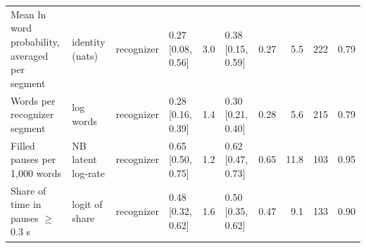 {\begin{tabular}{@{}p{}p{}llrlrrrr@{}}
Mean ln word probability, averaged per segment & identity (nats) & recognizer & 0.27 [0.08, 0.56] & 3.0 & 0.38 [0.15, 0.59] & 0.27 & 5.5 & 222 & 0.79 \\
Words per recognizer segment & log words & recognizer & 0.28 [0.16, 0.39] & 1.4 & 0.30 [0.21, 0.40] & 0.28 & 5.6 & 215 & 0.79 \\
Filled pauses per 1,000 words & NB latent log-rate & recognizer & 0.65 [0.50, 0.75] & 1.2 & 0.62 [0.47, 0.73] & 0.65 & 11.8 & 103 & 0.95 \\
Share of time in pauses $\geq$ 0.3 s & logit of share & recognizer & 0.48 [0.32, 0.62] & 1.6 & 0.50 [0.35, 0.62] & 0.47 & 9.1 & 133 & 0.90 \\
\bottomrule
\end{tabular}}
